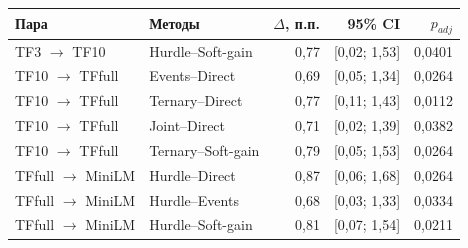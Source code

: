 \begin{tabular}{llrrr}
\toprule
Пара & Методы & $\Delta$, п.п. & 95\% CI & $p_{adj}$ \\
\midrule
TF3 $\to$ TF10 & Hurdle--Soft-gain & 0{,}77 & [0{,}02; 1{,}53] & 0{,}0401 \\
TF10 $\to$ TFfull & Events--Direct & 0{,}69 & [0{,}05; 1{,}34] & 0{,}0264 \\
TF10 $\to$ TFfull & Ternary--Direct & 0{,}77 & [0{,}11; 1{,}43] & 0{,}0112 \\
TF10 $\to$ TFfull & Joint--Direct & 0{,}71 & [0{,}02; 1{,}39] & 0{,}0382 \\
TF10 $\to$ TFfull & Ternary--Soft-gain & 0{,}79 & [0{,}05; 1{,}53] & 0{,}0264 \\
TFfull $\to$ MiniLM & Hurdle--Direct & 0{,}87 & [0{,}06; 1{,}68] & 0{,}0264 \\
TFfull $\to$ MiniLM & Hurdle--Events & 0{,}68 & [0{,}03; 1{,}33] & 0{,}0334 \\
TFfull $\to$ MiniLM & Hurdle--Soft-gain & 0{,}81 & [0{,}07; 1{,}54] & 0{,}0211 \\
\bottomrule
\end{tabular}
